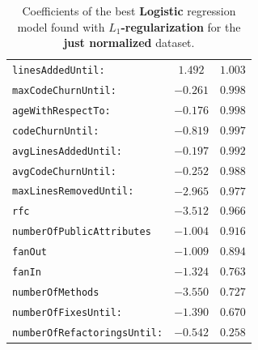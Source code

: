 \begin{table}[htbp]
\begin{tabular}{l c c}
        \texttt{linesAddedUntil:} & $1.492$ & $1.003$ \\
        \texttt{maxCodeChurnUntil:} & $-0.261$ & $0.998$ \\
        \texttt{ageWithRespectTo:} & $-0.176$ & $0.998$ \\
        \texttt{codeChurnUntil:} & $-0.819$ & $0.997$ \\
        \texttt{avgLinesAddedUntil:} & $-0.197$ & $0.992$ \\
        \texttt{avgCodeChurnUntil:} & $-0.252$ & $0.988$ \\
        \texttt{maxLinesRemovedUntil:} & $-2.965$ & $0.977$ \\
        \texttt{rfc} & $-3.512$ & $0.966$ \\
        \texttt{numberOfPublicAttributes} & $-1.004$ & $0.916$ \\
        \texttt{fanOut} & $-1.009$ & $0.894$ \\
        \texttt{fanIn} & $-1.324$ & $0.763$ \\
        \texttt{numberOfMethods} & $-3.550$ & $0.727$ \\
        \texttt{numberOfFixesUntil:} & $-1.390$ & $0.670$ \\
        \texttt{numberOfRefactoringsUntil:} & $-0.542$ & $0.258$ \\
        \bottomrule
    \end{tabular}
    \caption{Coefficients of the best \textbf{Logistic} regression model found with \textbf{$L_1$-regularization} for the \textbf{just normalized} dataset.}
    \label{tab:features_coeff_logistic_normalized}
\end{table}
